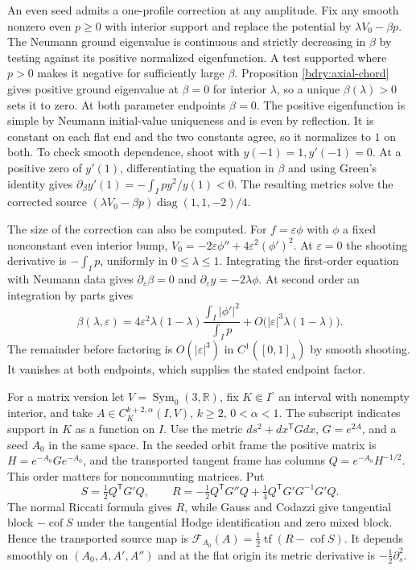 \documentclass[11pt]{article}
\numberwithin{equation}{section}
\theoremstyle{definition}
\theoremstyle{remark}
\begin{document}
An even seed admits a one-profile correction at any amplitude. Fix any
smooth nonzero even \(p\ge0\) with interior support and replace the
potential by \(\lambda V_0-\beta p\). The Neumann ground eigenvalue is
continuous and strictly decreasing in \(\beta\) by testing against
its positive normalized eigenfunction. A test supported where
\(p>0\) makes it negative for sufficiently large \(\beta\). Proposition
\ref{bdry:axial-chord} gives positive ground eigenvalue at
\(\beta=0\) for interior \(\lambda\), so a unique \(\beta(\lambda)>0\)
sets it to zero. At both parameter endpoints \(\beta=0\). The
positive eigenfunction is simple by Neumann initial-value uniqueness
and is even by reflection. It is constant on each flat end and the
two constants agree, so it normalizes to \(1\) on both. To check smooth
dependence, shoot with \(y(-1)=1,y'(-1)=0\). At a positive zero of
\(y'(1)\), differentiating the equation in \(\beta\) and using Green's
identity gives \(\partial_\beta y'(1)=-\int_I p y^2/y(1)<0\).
The resulting metrics solve the corrected source
\((\lambda V_0-\beta p)\operatorname{diag}(1,1,-2)/4\).

The size of the correction can also be computed. For \(f=\varepsilon\phi\)
with \(\phi\) a fixed nonconstant even interior bump,
\(V_0=-2\varepsilon\phi''+4\varepsilon^2(\phi')^2\).
At \(\varepsilon=0\) the shooting derivative is \(-\int_Ip\),
uniformly in \(0\le\lambda\le1\). Integrating the first-order
equation with Neumann data gives \(\partial_\varepsilon\beta=0\)
and \(\partial_\varepsilon y=-2\lambda\phi\). At second order an
integration by parts gives
\[
 \beta(\lambda,\varepsilon)=
 4\varepsilon^2\lambda(1-\lambda)\frac{\int_I|\phi'|^2}{\int_Ip}
 +O\bigl(|\varepsilon|^3\lambda(1-\lambda)\bigr).
\]
The remainder before factoring is \(O(|\varepsilon|^3)\) in
\(C^1([0,1]_\lambda)\) by smooth shooting. It vanishes at both
endpoints, which supplies the stated endpoint factor.

For a matrix version let \(V=\operatorname{Sym}_0(3,\mathbb R)\),
fix \(K\Subset I^\circ\) an interval with nonempty interior, and
take \(A\in C_K^{k+2,\alpha}(I,V)\), \(k\ge2\), \(0<\alpha<1\).
The subscript indicates support in \(K\) as a function on \(I\).
Use the metric \(ds^2+dx^{\mathsf T}Gdx\), \(G=e^{2A}\),
and a seed \(A_0\) in the same space. In the seeded orbit frame
the positive matrix is \(H=e^{-A_0}G e^{-A_0}\), and the
transported tangent frame has columns \(Q=e^{-A_0}H^{-1/2}\).
This order matters for noncommuting matrices. Put
\[
 S=\tfrac12 Q^{\mathsf T}G'Q,\qquad
 R=-\tfrac12 Q^{\mathsf T}G''Q+
       \tfrac14 Q^{\mathsf T}G'G^{-1}G'Q .
\]
The normal Riccati formula gives \(R\), while Gauss and Codazzi give
tangential block \(-\operatorname{cof}S\) under the tangential Hodge
identification and zero mixed block. Hence the transported source map
is \(\mathcal F_{A_0}(A)=\tfrac12\operatorname{tf}(R-\operatorname{cof}S)\).
It depends smoothly on \((A_0,A,A',A'')\) and at the flat origin its
metric derivative is \(-\tfrac12\partial_s^2\).
\end{document}
